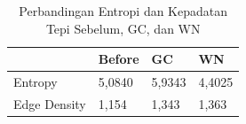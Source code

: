 \begin{table}[H]
	\centering
	\caption{Perbandingan Entropi dan Kepadatan Tepi Sebelum, GC, dan WN}
	\label{tab:entropi_edge_density}
	\begin{tabular}{|l|l|l|l|}
		\hline
		& \textbf{Before} & \textbf{GC} & \textbf{WN} \\ \hline
		Entropy & 5,0840 & 5,9343 & 4,4025 \\ \hline
		Edge Density & 1,154 & 1,343 & 1,363 \\ \hline
	\end{tabular}
\end{table}